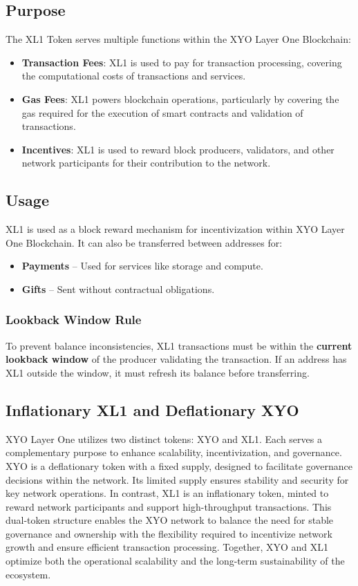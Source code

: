 \documentclass{article}
\begin{document}
\subsection{Purpose}
The XL1 Token serves multiple functions within the XYO Layer One Blockchain:

\begin{itemize}
    \item \textbf{Transaction Fees}: XL1 is used to pay for transaction processing, covering the computational costs of transactions and services.
    \item \textbf{Gas Fees}: XL1 powers blockchain operations, particularly by covering the gas required for the execution of smart contracts and validation of transactions.
    \item \textbf{Incentives}: XL1 is used to reward block producers, validators, and other network participants for their contribution to the network.
\end{itemize}

\subsection{Usage}
XL1 is used as a block reward mechanism for incentivization within XYO Layer
One Blockchain. It can also be transferred between addresses for:
\begin{itemize}
    \item \textbf{Payments} – Used for services like storage and compute.
    \item \textbf{Gifts} – Sent without contractual obligations.
\end{itemize}

\subsubsection{Lookback Window Rule}
To prevent balance inconsistencies, XL1 transactions must be within the
\textbf{current lookback window} of the producer validating the transaction. If
an address has XL1 outside the window, it must refresh its balance before
transferring.

\subsection{Inflationary XL1 and Deflationary XYO}
XYO Layer One utilizes two distinct tokens: XYO and XL1. Each serves a
complementary purpose to enhance scalability, incentivization, and governance.
XYO is a deflationary token with a fixed supply, designed to facilitate
governance decisions within the network. Its limited supply ensures stability
and security for key network operations. In contrast, XL1 is an inflationary
token, minted to reward network participants and support high-throughput
transactions. This dual-token structure enables the XYO network to balance the
need for stable governance and ownership with the flexibility required to
incentivize network growth and ensure efficient transaction processing.
Together, XYO and XL1 optimize both the operational scalability and the
long-term sustainability of the ecosystem.
\end{document}

